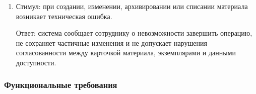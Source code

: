 \documentclass[12pt,a4paper]{article}
\begin{document}
\begin{enumerate}
		Ответ: система отклоняет операцию, отображает описание ошибки, не сохраняет
		изменения карточки или экземпляра и при необходимости фиксирует попытку
		в журнале безопасности.
		
		\item Стимул: при создании, изменении, архивировании или списании материала
		возникает техническая ошибка.
		
		Ответ: система сообщает сотруднику о невозможности завершить операцию,
		не сохраняет частичные изменения и не допускает нарушения согласованности
		между карточкой материала, экземплярами и данными доступности.
	\end{enumerate}
	
	\subsubsection{Функциональные требования}
	
\end{document}
